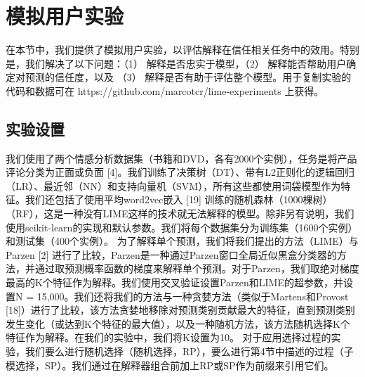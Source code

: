 \documentclass[12pt, a4paper]{ctexart} %
\begin{document}
\section{模拟用户实验}
在本节中，我们提供了模拟用户实验，以评估解释在信任相关任务中的效用。特别是，我们解决了以下问题：（1） 解释是否忠实于模型，（2） 解释能否帮助用户确定对预测的信任度，以及 （3） 解释是否有助于评估整个模型。用于复制实验的代码和数据可在 https://github.com/marcotcr/lime-experiments 上获得。
\subsection{实验设置}
我们使用了两个情感分析数据集（书籍和DVD，各有2000个实例），任务是将产品评论分类为正面或负面 [4]。我们训练了决策树（DT）、带有L2正则化的逻辑回归（LR）、最近邻（NN）和支持向量机（SVM），所有这些都使用词袋模型作为特征。我们还包括了使用平均word2vec嵌入 [19] 训练的随机森林（1000棵树）（RF），这是一种没有LIME这样的技术就无法解释的模型。除非另有说明，我们使用scikit-learn的实现和默认参数。我们将每个数据集分为训练集（1600个实例）和测试集（400个实例）。
为了解释单个预测，我们将我们提出的方法（LIME）与Parzen [2] 进行了比较，Parzen是一种通过Parzen窗口全局近似黑盒分类器的方法，并通过取预测概率函数的梯度来解释单个预测。对于Parzen，我们取绝对梯度最高的K个特征作为解释。我们使用交叉验证设置Parzen和LIME的超参数，并设置N = 15,000。我们还将我们的方法与一种贪婪方法（类似于Martens和Provost [18]）进行了比较，该方法贪婪地移除对预测类别贡献最大的特征，直到预测类别发生变化（或达到K个特征的最大值），以及一种随机方法，该方法随机选择K个特征作为解释。在我们的实验中，我们将K设置为10。
对于应用选择过程的实验，我们要么进行随机选择（随机选择，RP），要么进行第4节中描述的过程（子模选择，SP）。我们通过在解释器组合前加上RP或SP作为前缀来引用它们。
\end{document}
